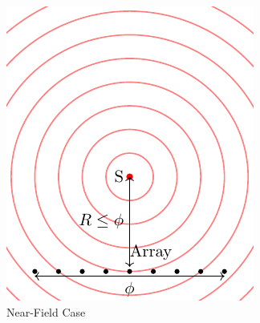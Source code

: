 \begin{figure}
    \centering
    \begin{subfigure}[b]{0.45\textwidth}
        \centering
        \includegraphics[width=\textwidth]{NearField.pdf}
        \caption{Near-Field Case}
        \label{fig:y equals x}
    \end{subfigure}
    \hfill
    \begin{subfigure}[b]{0.45\textwidth}
        \centering

\end{subfigure}
\end{figure}

